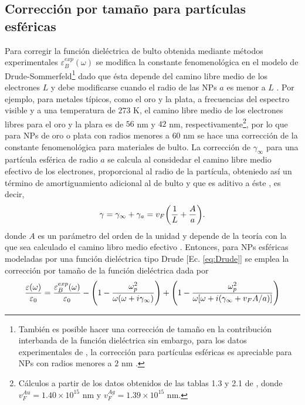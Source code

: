\subsection{Corrección por tamaño para partículas esféricas}

Para corregir la función dieléctrica de bulto obtenida mediante métodos experimentales $\varepsilon_B^{exp}(\omega)$ se modifica la constante fenomenológica  en el modelo de Drude-Sommerfeld\footnote{También es posible hacer una corrección de tamaño en la contribución interbanda de la función dieléctrica sin embargo, para los datos experimentales de \cite{johnson1972constants}, la corrección para partículas esféricas es apreciable para NPs con radios menores a $2$ nm \cite{mendoza2014determination}.} dado que ésta depende del camino libre medio de los electrones $L$ y debe modificarse cuando el radio de las NPs $a$ es menor a $L$ \cite{kreibig1995clusters}. Por ejemplo, para metales típicos, como el oro y la plata, a frecuencias del espectro visible y a una temperatura de $273$ K, el camino libre medio de los electrones libres para el oro y la plara es  de $56$ nm  y $42$ nm, respectivamente\footnote{Cálculos a partir de los datos obtenidos de las tablas 1.3 y 2.1 de \cite{ashcroft1976solid}, donde $v_F^{Au} = 1.40\times 10^{15}$ nm y $v_F^{Ag}=1.39\times 10^{15}$ nm.}, por lo que para NPs de oro o plata con radios menores a $60$ nm se hace una corrección de la constante fenomenológica para materiales de bulto. La corrección de $\gamma_\infty$ para una partícula esférica de radio $a$ se calcula al considedar el camino libre medio efectivo de los electrones, proporcional al radio de la partícula, obteniedo así un término de amortiguamiento adicional al de bulto y que es aditivo a éste \cite{kreibig1995clusters}, es decir,
	\begin{align*}
	 \gamma = \gamma_\infty + \gamma_a = v_F \qty(\frac{1}{L}+\frac{A}{a}). 
	\end{align*}
donde $A$ es un parámetro del orden de la unidad \cite{noguez2007surface,mendoza2014determination} y depende de la teoría con la que sea calculado el camino libro medio efectivo \cite{kreibig1995clusters}.  Entonces, para NPs esféricas modeladas por una función dieléctrica tipo Drude [Ec.  \eqref{eq:Drude}] se emplea  la corrección por tamaño de la función dieléctrica dada por
	\begin{align}
	\frac{\varepsilon(\omega)}{\varepsilon_0} = \frac{\varepsilon_B^{exp}(\omega)}{\varepsilon_0}
						 - \qty( 1 - \frac{\omega_p^2}{\omega(\omega+i\gamma_\infty)}) 
						 + \qty( 1 - \frac{\omega_p^2}{\omega[\omega+i(\gamma_\infty + v_F A/a)]})
			\label{eq:sizeCorrection}
	\end{align}
